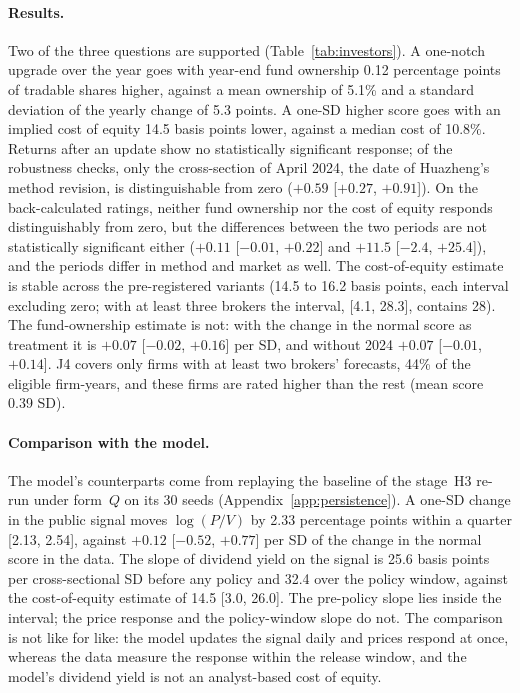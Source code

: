 \documentclass[11pt]{article}
\begin{document}
\paragraph{Results.} Two of the three questions are supported (Table~\ref{tab:investors}). A one-notch upgrade over the year goes with year-end fund ownership 0.12 percentage points of tradable shares higher, against a mean ownership of 5.1\% and a standard deviation of the yearly change of 5.3 points. A one-SD higher score goes with an implied cost of equity 14.5 basis points lower, against a median cost of 10.8\%. Returns after an update show no statistically significant response; of the robustness checks, only the cross-section of April 2024, the date of Huazheng's method revision, is distinguishable from zero ($+0.59$ [$+0.27$, $+0.91$]). On the back-calculated ratings, neither fund ownership nor the cost of equity responds distinguishably from zero, but the differences between the two periods are not statistically significant either ($+0.11$ [$-0.01$, $+0.22$] and $+11.5$ [$-2.4$, $+25.4$]), and the periods differ in method and market as well. The cost-of-equity estimate is stable across the pre-registered variants (14.5 to 16.2 basis points, each interval excluding zero; with at least three brokers the interval, [4.1, 28.3], contains 28). The fund-ownership estimate is not: with the change in the normal score as treatment it is $+0.07$ [$-0.02$, $+0.16$] per SD, and without 2024 $+0.07$ [$-0.01$, $+0.14$]. J4 covers only firms with at least two brokers' forecasts, 44\% of the eligible firm-years, and these firms are rated higher than the rest (mean score 0.39 SD).

\paragraph{Comparison with the model.} The model's counterparts come from replaying the baseline of the stage~H3 re-run under form~$Q$ on its 30 seeds (Appendix~\ref{app:persistence}). A one-SD change in the public signal moves $\log(P/V)$ by 2.33 percentage points within a quarter [2.13, 2.54], against $+0.12$ [$-0.52$, $+0.77$] per SD of the change in the normal score in the data. The slope of dividend yield on the signal is 25.6 basis points per cross-sectional SD before any policy and 32.4 over the policy window, against the cost-of-equity estimate of 14.5 [3.0, 26.0]. The pre-policy slope lies inside the interval; the price response and the policy-window slope do not. The comparison is not like for like: the model updates the signal daily and prices respond at once, whereas the data measure the response within the release window, and the model's dividend yield is not an analyst-based cost of equity.
\end{document}
